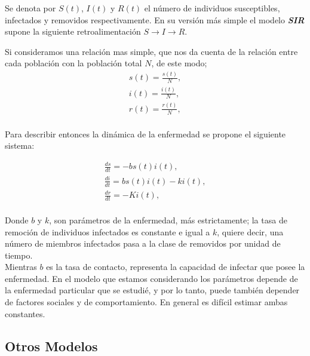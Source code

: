 \documentclass[journal]{IEEEtran}
\begin{document}
Se denota por $S(t)$, $I(t)$ y $R(t)$ el número de individuos susceptibles, infectados y removidos respectivamente.
En su versión más simple el modelo \textbf{\textit{SIR}} supone la siguiente retroalimentación $S \rightarrow I \rightarrow R$.\newline
  
Si consideramos una relación mas simple, que nos da cuenta de la relación entre cada población con la población total $N$, de este modo;
\begin{equation*}
  \begin{split}
s(t) = \frac{s(t)}{N},\\
i(t) = \frac{i(t)}{N},\\
r(t) = \frac{r(t)}{N},\\
  \end{split}
\end{equation*}

Para describir entonces la dinámica de la enfermedad se propone el siguiente sistema:  

\begin{equation}\label{SIR}
  \begin{split}
\frac{ds}{dt} = -bs(t)i(t),\\
\frac{di}{dt} = bs(t)i(t)-ki(t),\\
\frac{dr}{dt} = -Ki(t),\\
  \end{split}
\end{equation}

Donde $b$ y $k$, son parámetros de la enfermedad, más estrictamente; la tasa de remoción de individuos infectados es constante e igual a $k$, quiere decir, una
número de miembros infectados pasa a la clase de removidos por unidad de tiempo.\\ 
Mientras $b$ es la tasa de contacto, representa la capacidad de infectar que posee la enfermedad. En el modelo que estamos considerando los parámetros depende de la enfermedad
particular que se estudié, y por lo tanto, puede también depender de factores sociales y
de comportamiento. En general es difícil estimar ambas constantes.

\subsection{Otros Modelos}


\end{document}
